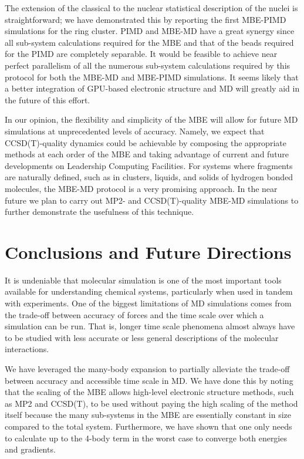 \documentclass[11pt, proquest]{uwthesis}[2020/02/24]
\let\ce\ch
\begin{document}
\par The extension of the classical to the nuclear statistical description of the nuclei is straightforward; we have demonstrated this by reporting the first MBE-PIMD simulations for the ring \ce{(H2O)4} cluster. PIMD and MBE-MD have a great synergy since all sub-system calculations required for the MBE and that of the beads required for the PIMD are completely separable. It would be feasible to achieve near perfect parallelism of all the numerous sub-system calculations required by this protocol for both the MBE-MD and MBE-PIMD simulations. It seems likely that a better integration of GPU-based electronic structure and MD will greatly aid in the future of this effort.

\par In our opinion, the flexibility and simplicity of the MBE will allow for future MD simulations at unprecedented levels of accuracy. Namely, we expect that CCSD(T)-quality dynamics could be achievable by composing the appropriate methods at each order of the MBE and taking advantage of current and future developments on Leadership Computing Facilities. For systems where fragments are naturally defined, such as in clusters, liquids, and solids of hydrogen bonded molecules, the MBE-MD protocol is a very promising approach. In the near future we plan to carry out MP2- and CCSD(T)-quality MBE-MD simulations to further demonstrate the usefulness of this technique.

\chapter{Conclusions and Future Directions}

\par It is undeniable that molecular simulation is one of the most important tools available for understanding chemical systems, particularly when used in tandem with experiments. One of the biggest limitations of MD simulations comes from the trade-off between accuracy of forces and the time scale over which a simulation can be run. That is, longer time scale phenomena almost always have to be studied with less accurate or less general descriptions of the molecular interactions.

\par We have leveraged the many-body expansion to partially alleviate the trade-off between accuracy and accessible time scale in MD. We have done this by noting that the scaling of the MBE allows high-level electronic structure methods, such as MP2 and CCSD(T), to be used without paying the high scaling of the method itself because the many sub-systems in the MBE are essentially constant in size compared to the total system. Furthermore, we have shown that one only needs to calculate up to the 4-body term in the worst case to converge both energies and gradients.
\end{document}
